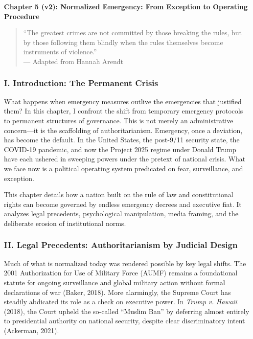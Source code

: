 \documentclass[
]{article}
\author{}
\date{}
\begin{document}
\textbf{Chapter 5 (v2): Normalized Emergency: From Exception to Operating Procedure}

\begin{quote}
``The greatest crimes are not committed by those breaking the rules, but by those following them blindly when the rules themselves become instruments of violence.''\\
--- Adapted from Hannah Arendt
\end{quote}

\subsubsection{I. Introduction: The Permanent Crisis}\label{i.-introduction-the-permanent-crisis}

What happens when emergency measures outlive the emergencies that justified them? In this chapter, I confront the shift from temporary emergency protocols to permanent structures of governance. This is not merely an administrative concern---it is the scaffolding of authoritarianism. Emergency, once a deviation, has become the default. In the United States, the post-9/11 security state, the COVID-19 pandemic, and now the Project 2025 regime under Donald Trump have each ushered in sweeping powers under the pretext of national crisis. What we face now is a political operating system predicated on fear, surveillance, and exception.

This chapter details how a nation built on the rule of law and constitutional rights can become governed by endless emergency decrees and executive fiat. It analyzes legal precedents, psychological manipulation, media framing, and the deliberate erosion of institutional norms.

\subsubsection{II. Legal Precedents: Authoritarianism by Judicial Design}\label{ii.-legal-precedents-authoritarianism-by-judicial-design}

Much of what is normalized today was rendered possible by key legal shifts. The 2001 Authorization for Use of Military Force (AUMF) remains a foundational statute for ongoing surveillance and global military action without formal declarations of war (Baker, 2018). More alarmingly, the Supreme Court has steadily abdicated its role as a check on executive power. In \emph{Trump v. Hawaii} (2018), the Court upheld the so-called ``Muslim Ban'' by deferring almost entirely to presidential authority on national security, despite clear discriminatory intent (Ackerman, 2021).
\end{document}

